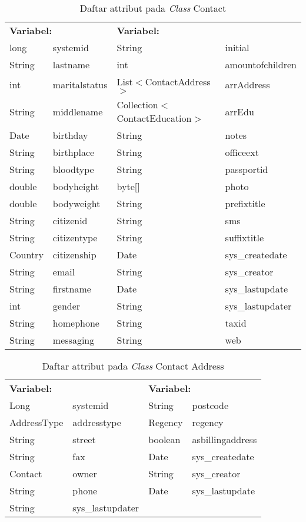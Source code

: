 \begin{table}[H]
	\caption{Daftar attribut pada \textit{Class} Contact}
	\centering
	\small
	\begin{adjustbox}{width=1\textwidth}	
		\begin{tabular}{|p{2cm} p{2.1cm} p{5cm} p{3.1cm}|}
			\hline
			\multicolumn{2}{|l}{\textbf{Variabel:}}&\multicolumn{2}{l|}{\textbf{Variabel:}}\\
			long&systemid&String&initial\\
			String&lastname&int&amountofchildren\\
			int&maritalstatus&List$<$ContactAddress$>$&arrAddress\\
			String&middlename&Collection$<$ContactEducation$>$&arrEdu\\
			Date&birthday&String&notes\\
			String&birthplace&String&officeext\\
			String&bloodtype&String&passportid\\
			double&bodyheight&byte[]&photo\\
			double&bodyweight&String&prefixtitle\\
			String&citizenid&String&sms\\
			String&citizentype&String&suffixtitle\\
			Country&citizenship&Date&sys\_createdate\\
			String&email&String&sys\_creator\\
			String&firstname&Date&sys\_lastupdate\\
			int&gender&String&sys\_lastupdater\\
			String&homephone&String&taxid\\
			String&messaging&String&web\\
			\hline
		\end{tabular}
	\end{adjustbox}
\end{table}
\begin{table}[H]
	\caption{Daftar attribut pada \textit{Class} Contact Address}
	\centering
	\small
	\begin{adjustbox}{width=1\textwidth}	
		\begin{tabular}{|p{4cm} p{2.1cm} p{3cm} p{3.1cm}|}
			\hline
			\multicolumn{2}{|l}{\textbf{Variabel:}}&\multicolumn{2}{l|}{\textbf{Variabel:}}\\
			Long&systemid&String&postcode\\
			AddressType&addresstype&Regency&regency\\
			String&street&boolean&asbillingaddress\\
			String&fax&Date&sys\_createdate\\
			Contact&owner&String&sys\_creator\\
			String&phone&Date&sys\_lastupdate\\
			String&sys\_lastupdater&&\\
			\hline
		\end{tabular}
	\end{adjustbox}
\end{table}

